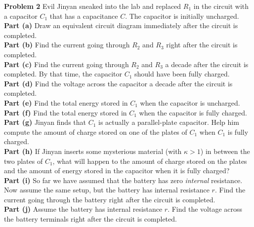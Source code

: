 \documentclass[11pt]{article}
\begin{document}
\newpage
\noindent\textbf{Problem 2} Evil Jinyan sneaked into the lab and replaced $R_1$ in the circuit with a capacitor $C_1$ that has a capacitance $C$. The capacitor is initially uncharged.\\

\noindent\textbf{Part (a)} Draw an equivalent circuit diagram immediately after the circuit is completed. \\

\noindent\textbf{Part (b)} Find the current going through $R_2$ and $R_3$ right after the circuit is completed.\\

\noindent\textbf{Part (c)} Find the current going through $R_2$ and $R_3$ a decade after the circuit is completed. By that time, the capacitor $C_1$ should have been fully charged. \\

\noindent\textbf{Part (d)} Find the voltage across the capacitor a decade after the circuit is completed.\\

\noindent\textbf{Part (e)} Find the total energy stored in $C_1$ when the capacitor is uncharged.\\

\noindent\textbf{Part (f)} Find the total energy stored in $C_1$ when the capacitor is fully charged.\\

\noindent\textbf{Part (g)} Jinyan finds that $C_1$ is actually a parallel-plate capacitor. Help him compute the amount of charge stored on one of the plates of $C_1$ when $C_1$ is fully charged. \\

\noindent\textbf{Part (h)} If Jinyan inserts some mysterious material (with $\kappa > 1$) in between the two plates of $C_1$, what will happen to the amount of charge stored on the plates and the amount of energy stored in the capacitor when it is fully charged?\\

\noindent\textbf{Part (i)} So far we have assumed that the battery has zero \textit{internal} resistance. Now assume the same setup, but the battery has internal resistance $r$. Find the current going through the battery right after the circuit is completed.\\

\noindent\textbf{Part (j)} Assume the battery has internal resistance $r$. Find the voltage across the battery terminals right after the circuit is completed.\\
\end{document}
